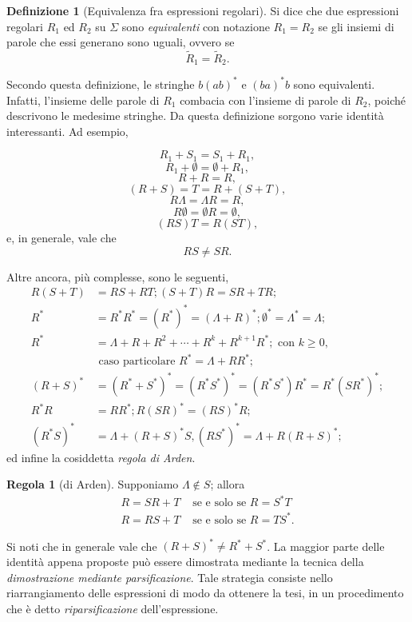 \documentclass[10pt]{\classname}
\theoremstyle{newlinethm}
\theoremstyle{theorem}
\theoremstyle{definition}
\newtheorem{definizione}{Definizione}[section]
\theoremstyle{definition}
\newtheorem{regola}{Regola}[section]
\theoremstyle{definition}
\theoremstyle{definition}
\begin{document}
\begin{definizione}[Equivalenza fra espressioni regolari]
Si dice che due espressioni regolari $R_1$ ed $R_2$ su $\Sigma$ sono \emph{equivalenti} con notazione $R_1 = R_2$ se gli insiemi di parole che essi generano sono uguali, ovvero se \[\tilde R_1 = \tilde R_2.\]
\end{definizione}

Secondo questa definizione, le stringhe $b(ab)^*$ e $(ba)^* b$ sono equivalenti. Infatti, l'insieme delle parole di $R_1$ combacia con l'insieme di parole di $R_2$, poiché descrivono le medesime stringhe. Da questa definizione sorgono varie identità interessanti. Ad esempio,

\[  R_1 +  S_1 =  S_1 +  R_1,\]
\[  R_1 + \emptyset = \emptyset +  R_1,\]
\[  R +  R =  R,\]
\[ ( R +  S) =  T =  R + ( S +  T),\]
\[ R \Lambda  = \Lambda  R =  R,\]
\[ R \emptyset  = \emptyset  R = \emptyset,\]
\[( R  S)  T  =  R (  S  T),\]
e,  in generale, vale che
\[ R  S \neq  S  R.\]

Altre ancora, più complesse, sono le seguenti, 
\begin{align*}
    R(S + T) &= RS + RT;  (S + T)R = SR + TR; \\
    R^* &= R^* R^* = (R^*)^* = (\Lambda + R)^*; \emptyset^* = \Lambda^* = \Lambda; \\
    R^* &= \Lambda + R + R^2 + \cdots + R^k + R^{k+1}R^*; \mbox{ con } k \geq 0, \\
        &  \mbox{ caso particolare } R^* = \Lambda + RR^*; \\
    (R+S)^* &= (R^* + S^*)^* = (R^* S^*)^*  = (R^* S^*)R^* = R^*(SR^*)^*; \\
    R^* R &= RR^*;  R(SR)^* = (RS)^*R; \\
    (R^*S)^* &= \Lambda  + (R + S)^*S, (RS^*)^* =\Lambda + R(R + S)^*;
\end{align*}
ed infine la cosiddetta \emph{regola di Arden}.

\begin{regola}[di Arden] Supponiamo $\Lambda \notin S$; allora
    \begin{align*}
        R = SR + T & \mbox{ se e solo se } R = S^* T \\
        R = RS + T & \mbox{ se e solo se } R = T S^*.
    \end{align*}
\end{regola}

Si noti che in generale vale che $(R + S)^* \neq R^* + S^*$. La maggior parte
delle identità appena proposte può essere dimostrata mediante la tecnica della
\emph{dimostrazione mediante parsificazione}. Tale strategia consiste nello
riarrangiamento delle espressioni di modo da ottenere la tesi, in un
procedimento che è detto \emph{riparsificazione} dell'espressione.
\end{document}
